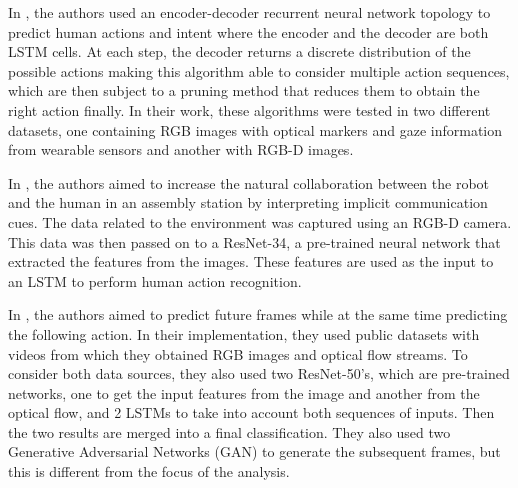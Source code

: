 \documentclass[conference]{IEEEtran}
\begin{document}
In \textcite{Schydlo2018}, the authors used an encoder-decoder recurrent neural network topology to predict human actions and intent where the encoder and the decoder are both LSTM cells. At each step, the decoder returns a discrete distribution of the possible actions making this algorithm able to consider multiple action sequences, which are then subject to a pruning method that reduces them to obtain the right action finally. In their work, these algorithms were tested in two different datasets, one containing RGB images with optical markers and gaze information from wearable sensors and another with RGB-D images.

In \textcite{Moutinho2023}, the authors aimed to increase the natural collaboration between the robot and the human in an assembly station by interpreting implicit communication cues. The data related to the environment was captured using an RGB-D camera. This data was then passed on to a ResNet-34, a pre-trained neural network that extracted the features from the images. These features are used as the input to an LSTM to perform human action recognition.

In \textcite{Gammulle2019}, the authors aimed to predict future frames while at the same time predicting the following action. In their implementation, they used public datasets with videos from which they obtained RGB images and optical flow streams. To consider both data sources, they also used two ResNet-50’s, which are pre-trained networks, one to get the input features from the image and another from the optical flow, and 2 LSTMs to take into account both sequences of inputs. Then the two results are merged into a final classification. They also used two Generative Adversarial Networks (GAN) to generate the subsequent frames, but this is different from the focus of the analysis.
\end{document}

